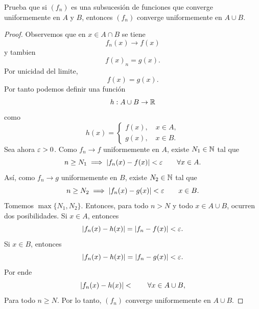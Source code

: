 \documentclass[12pt,a4paper]{article}
\begin{document}
    \begin{mdframed}[style=mdpinkbox,frametitle={Ejercicio 7}]
        Prueba que si $(f_{n})$ es una subsucesión de funciones que converge uniformemente en $A$
        y $B$, entonces $(f_{n})$ converge uniformemente en $A\cup B$.
    \end{mdframed}

    \begin{proof}
        Observemos que en $x\in A\cap B$ se tiene
        \begin{equation*}
            f_{n}(x)\to f(x)
        \end{equation*}
        y tambien
        \begin{equation*}
            f(x)_{n}=g(x).
        \end{equation*}
        Por unicidad del limite,
        \begin{equation*}
            f(x)=g(x).
        \end{equation*}
        Por tanto podemos definir una función
        \begin{equation*}
            h:A\cup B\to\mathbb{R}
        \end{equation*}
        como
        \begin{equation*}
            h(x)=
            \begin{cases}
                f(x),\quad x\in A,\\
                g(x),\quad x\in B.
            \end{cases}
        \end{equation*}
        Sea ahora $\varepsilon>0$. Como $f_{n}\to f$ uniformemente en $A$, existe $N_{1}\in\mathbb{N}$ tal que
        \begin{equation*}
            n\geq N_{1}\implies\abs{f_{n}(x)-f(x)}<\varepsilon\qquad\forall x\in A.
        \end{equation*}
        Así, como $f_{n}\to g$ uniformemente en $B$, existe $N_{2}\in\mathbb{N}$ tal que
        \begin{equation*}
            n\geq N_{2}\implies \abs{f_{n}(x)-g(x)}<\varepsilon\qquad x\in B.
        \end{equation*}
        Tomemos $\max\{N_{1},N_{2}\}$. Entonces, para todo $n\gt N$ y todo $x\in A\cup B$, ocurren dos posibilidades. Si
        $x\in A$, entonces
        \begin{equation*}
            \abs{f_{n}(x)-h(x)}=\abs{f_{n}-f(x)}<\varepsilon.
        \end{equation*}
        Si $x\in B$, entonces
        \begin{equation*}
            \abs{f_{n}(x)-h(x)}=\abs{f_{n}-g(x)}<\varepsilon.
        \end{equation*}
        Por ende
        \begin{equation*}
            \abs{f_{n}(x)-h(x)}<\qquad\forall x\in A\cup B,
        \end{equation*}
        Para todo $n\geq N$. Por lo tanto, $(f_{n})$ converge uniformemente en $A\cup B$.
    \end{proof}
\end{document}
